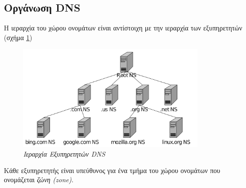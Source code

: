 %
%
\subsection{Οργάνωση DNS}

Η ιεραρχία του χώρου ονομάτων είναι αντίστοιχη με την ιεραρχία των εξυπηρετητών (σχήμα \ref{6-3})

\begin{figure}[!ht]
  \centering
  \includegraphics[width=0.85\textwidth]{images/chapter6/6-3}
  \caption {\textsl{Ιεραρχία Εξυπηρετητών DNS}}
  \label{6-3}
\end{figure}

Κάθε εξυπηρετητής είναι υπεύθυνος για ένα τμήμα του χώρου ονομάτων που ονομάζεται \emph{ζώνη (zone)}.

